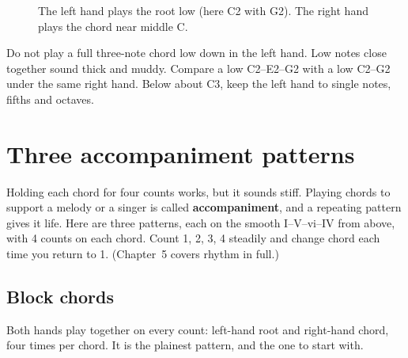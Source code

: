 \begin{figure}[htbp]
\centering
{}
\caption{The left hand plays the root low (here C2 with G2). The right hand plays the chord near middle C.}
\label{fig:two-hand-layout}
\end{figure}

\begin{trapbox}
Do not play a full three-note chord low down in the left hand. Low notes close together sound thick and muddy. Compare a low C2--E2--G2  with a low C2--G2 under the same right hand.  Below about C3, keep the left hand to single notes, fifths and octaves.
\end{trapbox}

\section{Three accompaniment patterns}

Holding each chord for four counts works, but it sounds stiff. Playing chords to support a melody or a singer is called \textbf{accompaniment}, and a repeating pattern gives it life. Here are three patterns, each on the smooth I--V--vi--IV from above, with 4 counts on each chord. Count 1, 2, 3, 4 steadily and change chord each time you return to 1. (Chapter~5 covers rhythm in full.)

\subsection*{Block chords}

Both hands play together on every count: left-hand root and right-hand chord, four times per chord. It is the plainest pattern, and the one to start with. 

